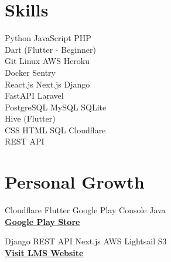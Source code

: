 \documentclass[]{deedy-resume-openfont}
\begin{document}
\begin{minipage}[t]{0.33\textwidth}

    \section{Skills}  
    \vspace{4pt}  
    \textbullet{} Python \textbullet{} JavaScript \textbullet{} PHP \\ \textbullet{} Dart (Flutter - Beginner) \\  
    \vspace{6pt}  
    \textbullet{} Git \textbullet{} Linux \textbullet{} AWS \textbullet{} Heroku \\ \textbullet{} Docker \textbullet{} Sentry \\  
    \vspace{6pt}  
    \textbullet{} React.js \textbullet{} Next.js \textbullet{} Django \\ \textbullet{} FastAPI \textbullet{} Laravel \\  
    \vspace{6pt}  
    \textbullet{} PostgreSQL \textbullet{} MySQL \textbullet{} SQLite \\ \textbullet{} Hive (Flutter) \\  
    \vspace{6pt}  
    \textbullet{} CSS \textbullet{} HTML \textbullet{} SQL \textbullet{} Cloudflare \\ \textbullet{} REST API \\  
    \vspace{6pt}  



    \section{Personal Growth}  

    \vspace{4pt}  
    \textbullet{} Cloudflare \textbullet{} Flutter \textbullet{} Google Play Console \textbullet{} Java \\  
    \href{https://play.google.com/store/apps/details?id=com.yashrajs.hugo}{\bf Google Play Store}  

    \vspace{6pt}  
    \textbullet{} Django \textbullet{} REST API \textbullet{} Next.js \textbullet{} AWS Lightsail \textbullet{} S3 \\  
    \href{http://hometeacherhub.com/}{\bf Visit LMS Website}  


\end{minipage}
\end{document}
